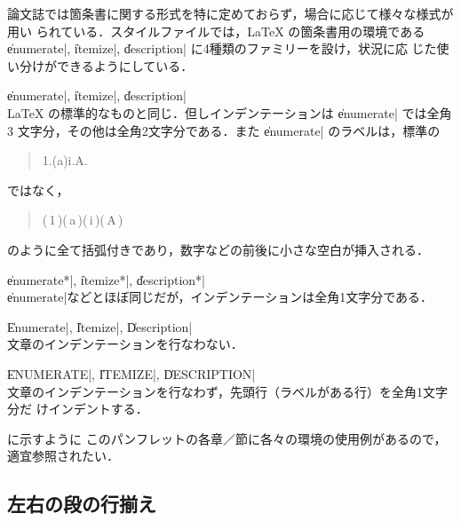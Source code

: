 論文誌では箇条書に関する形式を特に定めておらず，場合に応じて様々な様式が用い
られている．スタイルファイルでは，{\LaTeX} の箇条書用の環境である
\|enumerate|, \|itemize|, \|description| に4種類のファミリーを設け，状況に応
じた使い分けができるようにしている．
%
\begin{itemize*}
\item \|enumerate|, \|itemize|, \|description|\\
{\LaTeX} の標準的なものと同じ．但しインデンテーションは \|enumerate| では全角3
文字分，その他は全角2文字分である．また \|enumerate| のラベルは，標準の
%
\begin{quote}
1.\quad (a)\quad i.\quad A.
\end{quote}
%
ではなく，
%
\begin{quote}
(\,1\,)\quad (\,a\,)\quad (\,i\,)\quad (\,A\,)
\end{quote}
%
のように全て括弧付きであり，数字などの前後に小さな空白が挿入される．

\item \|enumerate*|, \|itemize*|, \|description*|\\
\|enumerate|などとほぼ同じだが，インデンテーションは全角1文字分である．

\item \|Enumerate|, \|Itemize|, \|Description|\\
文章のインデンテーションを行なわない．

\item \|ENUMERATE|, \|ITEMIZE|, \|DESCRIPTION|\\
文章のインデンテーションを行なわず，先頭行（ラベルがある行）を全角1文字分だ
けインデントする．
\end{itemize*}
%
 に示すように
このパンフレットの各章／節に各々の環境の使用例があるので，適宜参照されたい．


\subsection{左右の段の行揃え}

